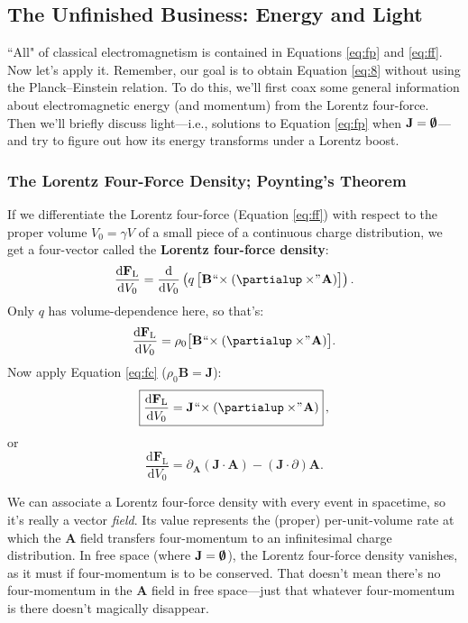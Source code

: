 \documentclass[12pt]{article}
\renewcommand{\vv}[1]{\mathbf{#1}}
\newcommand{\dd}[1]{\mathrm{d}#1}
\begin{document}
\subsection{The Unfinished Business: Energy and Light}

``All" of classical electromagnetism is contained in Equations \ref{eq:fp} and \ref{eq:ff}. Now let's apply it. Remember, our goal is to obtain Equation \ref{eq:8} without using the Planck--Einstein relation. To do this, we'll first coax some general information about electromagnetic energy (and momentum) from the Lorentz four-force. Then we'll briefly discuss light---i.e., solutions to Equation \ref{eq:fp} when $\vv J = \textrm{\mbox{\boldmath $\emptyset$}}$---and try to figure out how its energy transforms under a Lorentz boost.

\subsubsection{The Lorentz Four-Force Density; Poynting's Theorem}\label{sssec:lffd}

If we differentiate the Lorentz four-force (Equation \ref{eq:ff}) with respect to the proper volume ${V_0 = \gamma V}$ of a small piece of a continuous charge distribution, we get a four-vector called the \textbf{Lorentz four-force density}:
\begin{equation*}
\dfrac{\dd \vv F_{\mathrm{L}}}{\dd V_0} = \dfrac{\dd}{\dd V_0} \left( q \, \bigl[ \vv B \mkern1mu `` \mkern-4mu \times (\partialup \times \mkern-4mu " \mkern1mu \vv A) \bigr]  \right) .
\end{equation*}
Only $q$ has volume-dependence here, so that's:
\begin{equation*}
\dfrac{\dd \vv F_{\mathrm{L}}}{\dd V_0} = \rho_0 \bigl[ \vv B \mkern1mu `` \mkern-4mu \times (\partialup \times \mkern-4mu " \mkern1mu \vv A) \bigr] .
\end{equation*}
Now apply Equation \ref{eq:fc} ($\rho_0 \vv B = \vv J$):
\begin{equation}\label{eq:lffd}
\boxed{ \dfrac{\dd \vv F_{\mathrm{L}}}{\dd V_0} = \vv J \mkern1mu `` \mkern-4mu \times (\partialup \times \mkern-4mu " \mkern1mu \vv A) } \, ,
\end{equation}
or
\begin{equation*}
\dfrac{\dd \vv F_{\mathrm{L}}}{\dd V_0} = \partialup_{\vv A} (\vv J \cdot \vv A) - ( \vv J \cdot \partialup) \vv A .
\end{equation*}

We can associate a Lorentz four-force density with every event in spacetime, so it's really a vector \emph{field}. Its value represents the (proper) per-unit-volume rate at which the $\vv A$ field transfers four-momentum to an infinitesimal charge distribution. In free space (where $\vv J = \textrm{\mbox{\boldmath $\emptyset$}}$), the Lorentz four-force density vanishes, as it must if four-momentum is to be conserved. That doesn't mean there's no four-momentum in the $\vv A$ field in free space---just that whatever four-momentum is there doesn't magically disappear.
\end{document}
